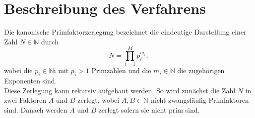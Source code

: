 \chapter{Beschreibung des Verfahrens}
Die kanonische Primfaktorzerlegung bezeichnet die eindeutige Darstellung einer Zahl $N\in\mathbb{N}$ durch
\begin{equation*}
  N=\prod\limits_{i=1}^M p_i^{m_i},
\end{equation*}
wobei die $p_i\in\mathbb{N}$i mit $p_i>1$ Primzahlen und die $m_i\in\mathbb{N}$ die zugehörigen Exponenten sind.\\
Diese Zerlegung kann rekursiv aufgebaut werden. So wird zunächst die Zahl $N$ in zwei Faktoren $A$ und $B$ zerlegt, wobei $A,B\in\mathbb{N}$ nicht zwangsläufig Primfaktoren sind. Danach werden $A$ und $B$ zerlegt sofern sie nicht prim sind.\\

